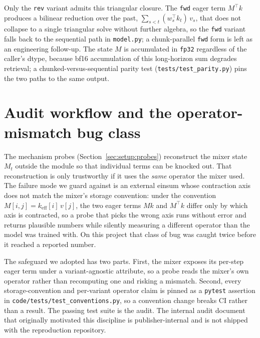 \documentclass[11pt]{article}
\begin{document}
Only the \texttt{rev} variant admits this triangular closure. The
\texttt{fwd} eager term $M^{\top} k$ produces a bilinear reduction over the
past, $\sum_{s<t} (w_s^{\top} k_t)\, v_s$, that does not collapse to a single
triangular solve without further algebra, so the \texttt{fwd} variant falls
back to the sequential path in \texttt{model.py}; a chunk-parallel
\texttt{fwd} form is left as an engineering follow-up. The state $M$ is
accumulated in \texttt{fp32} regardless of the caller's dtype, because bf16
accumulation of this long-horizon sum degrades retrieval; a
chunked-versus-sequential parity test (\texttt{tests/test\_parity.py}) pins
the two paths to the same output.

\section{Audit workflow and the operator-mismatch bug class}
\label{app:audit}

The mechanism probes (Section~\ref{sec:setup:probes}) reconstruct the mixer
state $M_t$ outside the module so that individual terms can be knocked out.
That reconstruction is only trustworthy if it uses the \emph{same} operator
the mixer used. The failure mode we guard against is an external einsum whose
contraction axis does not match the mixer's storage convention: under the
convention $M[i,j] = k_{\text{eff}}[i]\, v[j]$, the two eager terms
$M k$ and $M^{\top} k$ differ only by which axis is contracted, so a probe
that picks the wrong axis runs without error and returns plausible numbers
while silently measuring a different operator than the model was trained
with. On this project that class of bug was caught twice before it reached a
reported number.

The safeguard we adopted has two parts. First, the mixer exposes its
per-step eager term under a variant-agnostic attribute, so a probe reads the
mixer's own operator rather than recomputing one and risking a mismatch.
Second, every storage-convention and per-variant operator claim is pinned as
a \texttt{pytest} assertion in \texttt{code/tests/test\_conventions.py}, so a
convention change breaks CI rather than a result. The passing test suite is
the audit. The internal audit document that originally motivated this
discipline is publisher-internal and is not shipped with the reproduction
repository.
\end{document}
